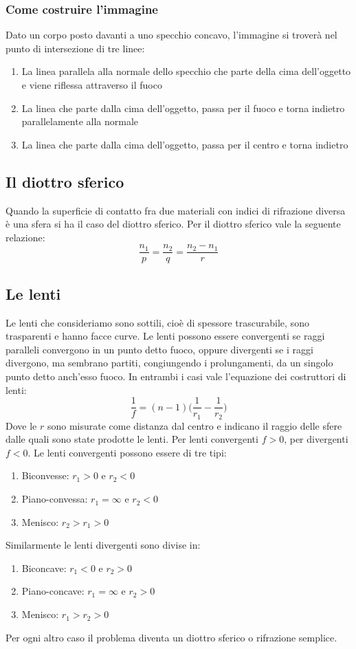 \documentclass{article}
\begin{document}
\subsubsection{Come costruire l'immagine}
Dato un corpo posto davanti a uno specchio concavo, l'immagine si troverà nel punto di intersezione di tre linee:
\begin{enumerate}
    \item La linea parallela alla normale dello specchio che parte della cima dell'oggetto e viene riflessa attraverso il fuoco
    \item La linea che parte dalla cima dell'oggetto, passa per il fuoco e torna indietro parallelamente alla normale
    \item La linea che parte dalla cima dell'oggetto, passa per il centro e torna indietro
\end{enumerate}

\subsection{Il diottro sferico}
Quando la superficie di contatto fra due materiali con indici di rifrazione diversa è una sfera si ha il caso del diottro sferico.
Per il diottro sferico vale la seguente relazione:
\begin{equation}
    \frac{n_1}{p}=\frac{n_2}{q}=\frac{n_2-n_1}{r}
\end{equation}

\subsection{Le lenti}
Le lenti che consideriamo sono sottili, cioè di spessore trascurabile, sono trasparenti e hanno facce curve. Le lenti possono essere convergenti se raggi paralleli convergono in un punto detto fuoco, oppure divergenti se i raggi divergono, ma sembrano partiti, congiungendo i prolungamenti, da un singolo punto detto anch'esso fuoco. In entrambi i casi vale l'equazione dei costruttori di lenti:
\begin{equation}
    \frac{1}{f}=(n-1)\bigg(\frac{1}{r_1}-\frac{1}{r_2}\bigg)
\end{equation}
Dove le $r$ sono misurate come distanza dal centro e indicano il raggio delle sfere dalle quali sono state prodotte le lenti.
Per lenti convergenti $f>0$, per divergenti $f<0$.
Le lenti convergenti possono essere di tre tipi:
\begin{enumerate}
    \item Biconvesse: $r_1>0$ e $r_2<0$
    \item Piano-convessa: $r_1=\infty$ e $r_2<0$
    \item Menisco: $r_2>r_1>0$
\end{enumerate}
Similarmente le lenti divergenti sono divise in:
\begin{enumerate}
    \item Biconcave: $r_1<0$ e $r_2>0$
    \item Piano-concave: $r_1=\infty$ e $r_2>0$
    \item Menisco: $r_1>r_2>0$
\end{enumerate}
Per ogni altro caso il problema diventa un diottro sferico o rifrazione semplice.
\end{document}
